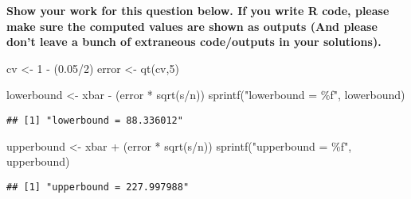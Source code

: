 \documentclass[
]{article}
\newenvironment{Shaded}{\begin{snugshade}}{\end{snugshade}}
\newcommand{\DecValTok}[1]{\textcolor[rgb]{0.00,0.00,0.81}{#1}}
\newcommand{\FloatTok}[1]{\textcolor[rgb]{0.00,0.00,0.81}{#1}}
\newcommand{\FunctionTok}[1]{\textcolor[rgb]{0.00,0.00,0.00}{#1}}
\newcommand{\NormalTok}[1]{#1}
\newcommand{\OtherTok}[1]{\textcolor[rgb]{0.56,0.35,0.01}{#1}}
\newcommand{\SpecialCharTok}[1]{\textcolor[rgb]{0.00,0.00,0.00}{#1}}
\newcommand{\StringTok}[1]{\textcolor[rgb]{0.31,0.60,0.02}{#1}}
\begin{document}
\textbf{Show your work for this question below. If you write R code,
please make sure the computed values are shown as outputs (And please
don't leave a bunch of extraneous code/outputs in your solutions).}

\begin{Shaded}
\begin{Highlighting}[]
\NormalTok{cv }\OtherTok{\textless{}{-}} \DecValTok{1} \SpecialCharTok{{-}}\NormalTok{ (}\FloatTok{0.05}\SpecialCharTok{/}\DecValTok{2}\NormalTok{)}
\NormalTok{error }\OtherTok{\textless{}{-}} \FunctionTok{qt}\NormalTok{(cv,}\DecValTok{5}\NormalTok{)}

\NormalTok{lowerbound }\OtherTok{\textless{}{-}}\NormalTok{ xbar }\SpecialCharTok{{-}}\NormalTok{ (error }\SpecialCharTok{*} \FunctionTok{sqrt}\NormalTok{(s}\SpecialCharTok{/}\NormalTok{n))}
\FunctionTok{sprintf}\NormalTok{(}\StringTok{"lowerbound = \%f"}\NormalTok{, lowerbound)}
\end{Highlighting}
\end{Shaded}

\begin{verbatim}
## [1] "lowerbound = 88.336012"
\end{verbatim}

\begin{Shaded}
\begin{Highlighting}[]
\NormalTok{upperbound }\OtherTok{\textless{}{-}}\NormalTok{ xbar }\SpecialCharTok{+}\NormalTok{ (error }\SpecialCharTok{*} \FunctionTok{sqrt}\NormalTok{(s}\SpecialCharTok{/}\NormalTok{n))}
\FunctionTok{sprintf}\NormalTok{(}\StringTok{"upperbound = \%f"}\NormalTok{, upperbound)}
\end{Highlighting}
\end{Shaded}

\begin{verbatim}
## [1] "upperbound = 227.997988"
\end{verbatim}
\end{document}
